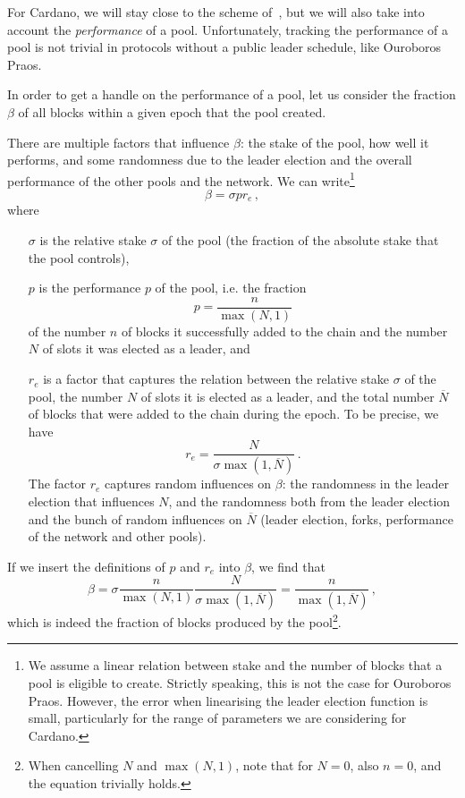 \documentclass[11pt,a4paper]{article}
\newcommand\Nbar{\overline{N}}
\begin{document}
For Cardano, we will stay close to the scheme of~\citep{bkks2018}, but we will
also take into account the \emph{performance} of a pool. Unfortunately, tracking
the performance of a pool is not trivial in protocols without a public leader
schedule, like Ouroboros Praos.

In order to get a handle on the performance of a pool, let us consider the
fraction \(\beta\) of all blocks within a given epoch that the pool created.

There are multiple factors that influence \(\beta\): the stake of the pool, how
well it performs, and some randomness due to the leader election and the overall
performance of the other pools and the network. We can write\footnote{We assume
  a linear relation between stake and the number of blocks that a pool is
  eligible to create. Strictly speaking, this is not the case for Ouroboros
  Praos. However, the error when linearising the leader election function is
  small, particularly for the range of parameters we are considering for
  Cardano.}
\[\beta = \sigma p r_e \,,\]
where
\begin{enumerate}
\item[\(\sigma\)] is the relative stake \(\sigma\) of the pool (the fraction of
  the absolute stake that the pool controls),
\item[\(p\)] is the performance \(p\) of the pool, i.e. the fraction
  \[
  p = \frac{n}{\max(N,1)}
  \]
  of the number \(n\) of blocks it successfully added to the chain and the
  number \(N\) of slots it was elected as a leader, and
\item[\(r_e\)] is a factor that captures the relation between the relative stake
  \(\sigma\) of the pool, the number \(N\) of slots it is elected as a leader,
  and the total number \(\Nbar\) of blocks that were added to the chain during
  the epoch. To be precise, we have
  \[r_e = \frac{N}{\sigma \max(1, \Nbar)}\,.\]
  The factor \(r_e\) captures random influences on \(\beta\): the
  randomness in the leader election that influences \(N\), and the randomness
  both from the leader election and the bunch of random influences on
  \(\Nbar\) (leader election, forks, performance of the network and other
  pools).
\end{enumerate}

If we insert the definitions of \(p\) and \(r_e\) into \(\beta\), we find that
\[
\beta = \sigma \frac{n}{\max(N,1)} \frac{N}{\sigma \max(1, \Nbar)}
= \frac{n}{\max(1, \Nbar)}\,,
\]
which is indeed the fraction of blocks produced by the pool\footnote{When
  cancelling \(N\) and \(\max(N,1)\), note that for \(N=0\), also \(n=0\), and
  the equation trivially holds.}.
\end{document}
